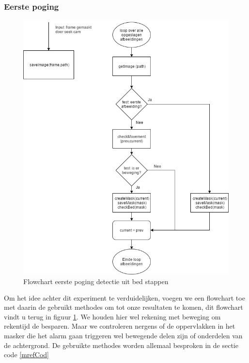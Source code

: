 \subsubsection{Eerste poging}
\label{ERefDUBEP}
\begin{figure}[h]
	\includegraphics[scale=0.45]{FlowChart_DetectUitBed_EerstePoging}
	\caption{Flowchart eerste poging detectie uit bed stappen}
	\label{imgFCDUBEP}
\end{figure}
Om het idee achter dit experiment te verduidelijken, voegen we een flowchart toe met daarin de gebruikt methodes om tot onze resultaten te komen, dit flowchart vindt u terug in figuur \ref{imgFCDUBEP}. We houden hier wel rekening met beweging om rekentijd de besparen. Maar we controleren nergens of de oppervlakken in het masker die het alarm gaan triggeren wel bewegende delen zijn of onderdelen van de achtergrond. De gebruikte methodes worden allemaal besproken in de sectie code \ref{mrefCod}


